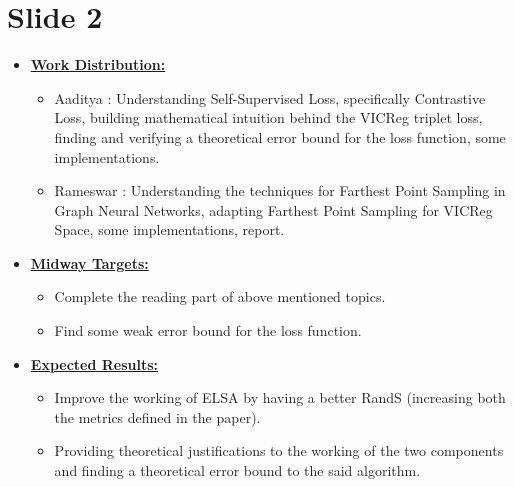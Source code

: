 \documentclass[10pt, xcolor=x11names,compress]{beamer}
\begin{document}
\section{Slide 2}
\begin{frame}{}
\begin{itemize}
    \item \underline{\textbf{Work Distribution:}}
    \begin{itemize}
        \item{Aaditya :} Understanding Self-Supervised Loss, specifically Contrastive Loss, building mathematical intuition behind the VICReg triplet loss, finding and verifying a theoretical error bound for the loss function, some implementations.
        \item{Rameswar :} Understanding the techniques for Farthest Point Sampling in Graph Neural Networks, adapting Farthest Point Sampling for VICReg Space, some implementations, report. 
    \end{itemize}
    \item \underline{\textbf{Midway Targets:}}
    \begin{itemize}
        \item Complete the reading part of above mentioned topics.
        \item Find some weak error bound for the loss function.
    \end{itemize}
        \item \underline{\textbf{Expected Results:}}
    \begin{itemize}
        \item Improve the working of ELSA by having a better RandS (increasing both the metrics defined in the paper).

        \item Providing theoretical justifications to the working of the two components and finding a theoretical error bound to the said algorithm.
    \end{itemize}
\end{itemize}

\end{frame}
\end{document}
